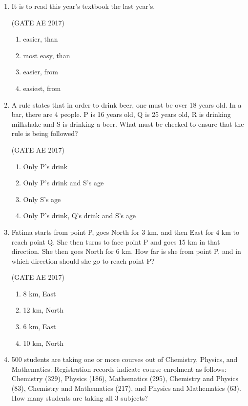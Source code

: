 \documentclass[journal,12pt,onecolumn]{IEEEtran}
\theoremstyle{remark}
\begin{document}
\begin{flushleft}
\begin{enumerate}
 

\item It is \underline{\hspace{2cm}} to read this year's textbook \underline{\hspace{2cm}} the last year's.  

\hfill (GATE AE 2017)  
\begin{enumerate}
\item easier, than  
\item most easy, than  
\item easier, from  
\item easiest, from  
\end{enumerate}  


\item A rule states that in order to drink beer, one must be over 18 years old. In a bar, there are 4 people.  
P is 16 years old, Q is 25 years old, R is drinking milkshake and S is drinking a beer.  
What must be checked to ensure that the rule is being followed? 

\hfill (GATE AE 2017)  

\begin{enumerate}
\item Only P's drink  
\item Only P's drink and S's age  
\item Only S's age  
\item Only P's drink, Q's drink and S's age  
\end{enumerate}  

\item Fatima starts from point P, goes North for 3 km, and then East for 4 km to reach point Q.  
She then turns to face point P and goes 15 km in that direction. She then goes North for 6 km.  
How far is she from point P, and in which direction should she go to reach point P?  

\hfill (GATE AE 2017)  
\begin{enumerate}
\item 8 km, East  
\item 12 km, North  
\item 6 km, East  
\item 10 km, North  
\end{enumerate}  

\item 500 students are taking one or more courses out of Chemistry, Physics, and Mathematics. Registration records indicate course enrolment as follows: Chemistry (329), Physics (186), Mathematics (295), Chemistry and Physics (83), Chemistry and Mathematics (217), and Physics and Mathematics (63). How many students are taking all 3 subjects?  


\end{enumerate}
\end{flushleft}
\end{document}

